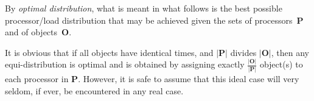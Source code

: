 By \emph{optimal distribution}, what is meant in what follows is the
best possible processor/load distribution that may be achieved given
the sets of processors~$\mathbf{P}$ and of objects~$\mathbf{O}$.

It is obvious that if all objects have identical times, and
$\vert\mathbf{P}\vert$ divides $\vert\mathbf{O}\vert$, then any
equi-distribution is optimal and is obtained by assigning exactly
$\tfrac{\vert\mathbf{O}\vert}{\vert\mathbf{P}\vert}$ object(s) to each
processor in $\mathbf{P}$.
However, it is safe to assume that this ideal case will very seldom,
if ever, be encountered in any real case.